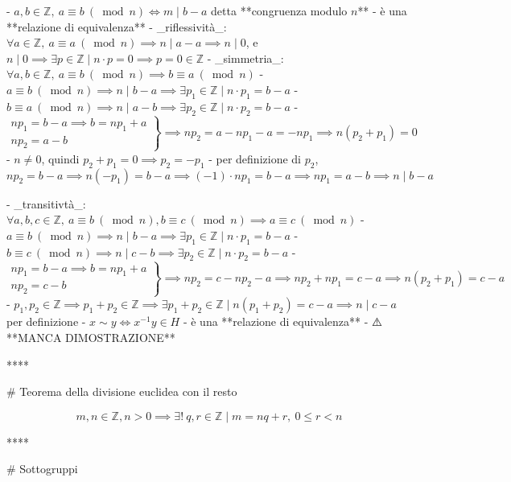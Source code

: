 - \( a, b \in \mathbb{Z}, \  a \equiv b \ (\bmod n) \iff m \mid b-a \) detta **congruenza modulo $n$**
  - è una **relazione di equivalenza**
    - _riflessività_: $\forall a \in \mathbb{Z}, \ a \equiv a \ (\bmod n)  \implies n \mid a - a \implies n \mid 0$, e $n \mid 0 \implies \exists p \in \mathbb{Z} \mid n \cdot p = 0 \implies p = 0 \in \mathbb{Z}$
    - _simmetria_: \(\forall a, b \in \mathbb{Z}, \ a \equiv b \ (\bmod n) \implies b \equiv a \ (\bmod n)\)
      - $a \equiv b \ (\bmod n) \implies n \mid b - a \implies \exists p_1 \in \mathbb{Z} \mid n \cdot p_1 = b - a$
      - $b \equiv a \ (\bmod n) \implies n \mid a - b \implies \exists p_2 \in \mathbb{Z} \mid n \cdot p_2 = b - a$
       - \( \left.\begin{array}{l}n p_{1}=b-a \implies b=n p_{1}+a \\ n p_{2}=a-b\end{array}\right\} \implies np_2 = a - np_1 - a = -np_1 \implies n(p_2 + p_1)=0 \)
       - \( n \neq 0 \), quindi \(p_{2}+p_{1}=0 \implies p_{2}=-p_{1} \)
       - per definizione di $p_2$, $np_2 = b - a \implies n (-p_1) = b - a \implies (-1) \cdot n p_1 = b - a \implies n p_1 = a -b \implies n \mid b - a$

    - _transitivtà_: \(\forall a, b, c \in \mathbb{Z}, \ a \equiv b \ (\bmod n), b \equiv c \ (\bmod n) \implies a \equiv c \ (\bmod n)\)
      - $a \equiv b \ (\bmod n) \implies n \mid b - a \implies \exists p_1 \in \mathbb{Z} \mid n \cdot p_1 = b - a$
      - $b \equiv c \ (\bmod n) \implies n \mid c - b \implies \exists p_2 \in \mathbb{Z} \mid n \cdot p_2 = b - a$
      - \( \left.\begin{array}{l}n p_{1}=b-a \implies b=n p_{1}+a \\ n p_{2}=c-b\end{array}\right\} \implies np_2 = c - np_2 - a \implies np_2 + np_1 = c - a \implies n(p_2 + p_1)=c -a \)
      - $p_{1}, p_{2} \in \mathbb{Z} \implies p_{1}+p_{2} \in \mathbb{Z} \implies \exists p_1 + p_2 \in \mathbb{Z} \mid n(p_1 + p_2) = c - a \implies n \mid c - a$ per definizione
- $x \sim y \iff x^{-1}y \in H$
  - è una **relazione di equivalenza**
    - ⚠️ **MANCA DIMOSTRAZIONE**

**** 

# Teorema della divisione euclidea con il resto

$$
m, n \in \mathbb{Z}, n>0 \implies \exists !  \ q, r \in \mathbb{Z} \mid m=n q+r, \ 0 \leq r<n
$$

****

# Sottogruppi

